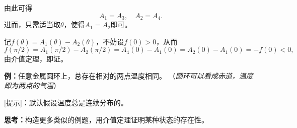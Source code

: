 \begin{center}
\end{center}

由此可得
$$A_1=A_3,\quad A_2=A_4.$$
进而，只需适当取$\theta$，使得$A_1=A_2$即可。

记$f(\theta)=A_1(\theta)-A_2(\theta)$，不妨设$f(0)>0$，从而
$$f(\pi/2)=A_1(\pi/2)-A_2(\pi/2)=A_4(0)-A_1(0)=A_2(0)-A_1(0)=-f(0)<0,$$
由介值定理，即证。

{\bf 例：}任意金属圆环上，总存在相对的两点温度相同。
（{\it 圆环可以看成赤道，温度即为两点的气温}）

[提示]：默认假设温度总是连续分布的。

{\bf 思考：}构造更多类似的例题，用介值定理证明某种状态的存在性。

\newpage

% 
% 
% 
% 
% 
% 
% 

